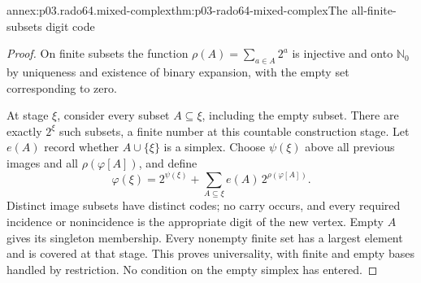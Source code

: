\begin{annexitem}{annex:p03.rado64.mixed-complex}{thm:p03-rado64-mixed-complex}{The all-finite-subsets digit code}
\begin{proof}
On finite subsets the function \(\rho(A)=\sum_{a\in A}2^a\) is injective and onto
\(\mathbb N_0\) by uniqueness and existence of binary expansion,
with the empty set corresponding to zero.

At stage \(\xi\), consider every subset \(A\subseteq\xi\), including
the empty subset. There are exactly \(2^\xi\) such subsets, a finite
number at this countable construction stage.
Let \(e(A)\) record whether \(A\cup\{\xi\}\) is a simplex.
Choose \(\psi(\xi)\) above all previous images and all \(\rho(\varphi[A])\),
and define
\[
 \varphi(\xi)=2^{\psi(\xi)}
       +\sum_{A\subseteq\xi}e(A)\,2^{\rho(\varphi[A])}.
\]
Distinct image subsets have distinct codes; no carry occurs, and every
required incidence or nonincidence is the appropriate digit of the new
vertex. Empty \(A\) gives its singleton membership. Every nonempty finite
set has a largest element and is covered at that stage. This proves
universality, with finite and empty bases handled by restriction.
No condition on the empty simplex has entered.
\end{proof}
\end{annexitem}

